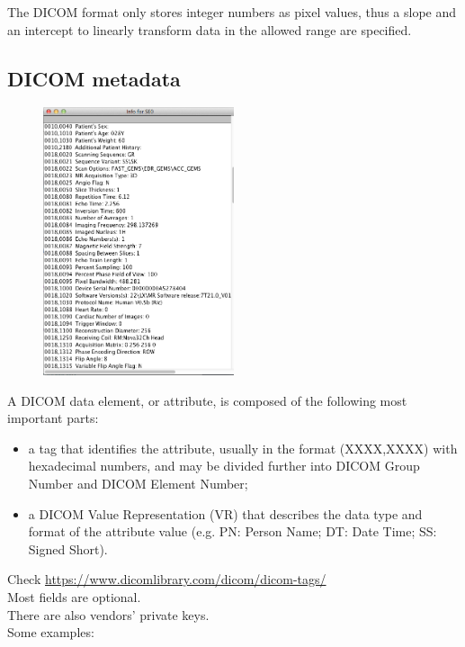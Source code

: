 The DICOM format only stores integer numbers as pixel values, thus a slope and an intercept to linearly transform data in the allowed range are specified.

\newpage
\subsection{DICOM metadata}

\begin{figure}
	\includegraphics[width=0.5\textwidth]{figure_med/dicom_meta}
\end{figure} 


A DICOM data element, or attribute, is composed of the
following most important parts:
\begin{itemize}

\item a tag that identifies the attribute, usually in the format
(XXXX,XXXX) with hexadecimal numbers, and may be divided
further into DICOM Group Number and DICOM Element Number;
\item a DICOM Value Representation (VR) that describes the data type
and format of the attribute value (e.g. PN: Person Name; DT: Date
Time; SS: Signed Short).

\end{itemize}

Check \url{https://www.dicomlibrary.com/dicom/dicom-tags/}\\
Most fields are optional.\\
There are also vendors’ private keys.\\
Some examples:

